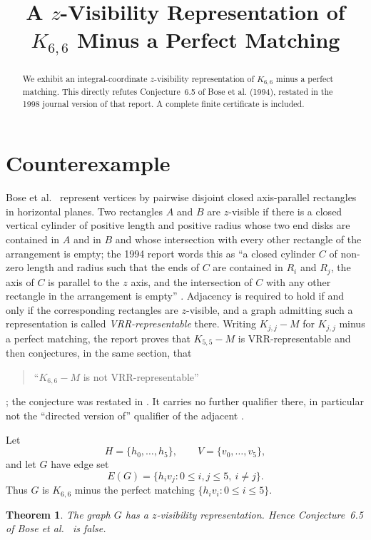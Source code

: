 \documentclass[11pt]{amsart}
\title[A $z$-visibility representation of $K_{6,6}-M$]
{A \texorpdfstring{$z$}{z}-Visibility Representation of
\texorpdfstring{$K_{6,6}$}{K6,6} Minus a Perfect Matching}
\date{}
\newtheorem{theorem}{Theorem}
\begin{document}
\begin{abstract}
We exhibit an integral-coordinate $z$-visibility representation of
$K_{6,6}$ minus a perfect matching.  This directly refutes
Conjecture~6.5 of Bose et al. (1994), restated in the 1998 journal
version of that report.  A complete finite certificate is included.
\end{abstract}

\maketitle

\section{Counterexample}

Bose et al.~\cite[Sec.~1.2]{BoseEtAl1998} represent vertices by pairwise
disjoint closed axis-parallel rectangles in horizontal planes.  Two rectangles
$A$ and $B$ are $z$-visible if there is a closed vertical cylinder of positive
length and positive radius whose two end disks are contained in $A$ and in $B$
and whose intersection with every other rectangle of the arrangement is empty;
the 1994 report words this as ``a closed cylinder $C$ of non-zero length and
radius such that the ends of $C$ are contained in $R_i$ and $R_j$, the axis of
$C$ is parallel to the $z$ axis, and the intersection of $C$ with any other
rectangle in the arrangement is empty'' \cite[Sec.~1]{BoseEtAl1994}.
Adjacency is required to hold if and only if the corresponding rectangles are
$z$-visible, and a graph admitting such a representation is called
\emph{VRR-representable} there.  Writing $K_{j,j}-M$ for $K_{j,j}$ minus a
perfect matching, the report proves that $K_{5,5}-M$ is VRR-representable
\cite[Theorem~6.3]{BoseEtAl1994} and then conjectures, in the same section,
that
\begin{quote}
``$K_{6,6}-M$ is not VRR-representable''
\end{quote}
\cite[Conjecture~6.5]{BoseEtAl1994}; the conjecture was restated in
\cite[Sec.~5]{BoseEtAl1998}.  It carries no further qualifier there, in
particular not the ``directed version of'' qualifier of the adjacent
\cite[Theorem~6.4]{BoseEtAl1994}.

Let
\[
  H=\{h_0,\ldots,h_5\},\qquad V=\{v_0,\ldots,v_5\},
\]
and let $G$ have edge set
\[
  E(G)=\{h_iv_j:0\le i,j\le5,\ i\ne j\}.
\]
Thus $G$ is $K_{6,6}$ minus the perfect matching
$\{h_iv_i:0\le i\le5\}$.

\begin{theorem}\label{thm:main}
The graph $G$ has a $z$-visibility representation.  Hence
Conjecture~6.5 of Bose et al.~
\cite[Conjecture~6.5]{BoseEtAl1994} is false.
\end{theorem}
\end{document}
